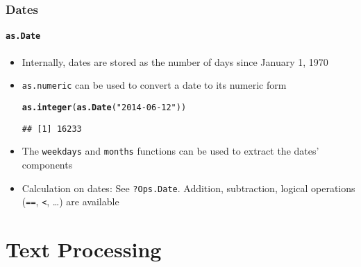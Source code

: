 \documentclass[paper=screen,mathserif]{beamer}\usepackage[]{graphicx}\usepackage[]{color}
\makeatletter
\newcommand{\hlstr}[1]{\textcolor[rgb]{0.192,0.494,0.8}{#1}}%
\newcommand{\hlstd}[1]{\textcolor[rgb]{0.345,0.345,0.345}{#1}}%
\newcommand{\hlkwd}[1]{\textcolor[rgb]{0.737,0.353,0.396}{\textbf{#1}}}%
\newenvironment{kframe}{%
 \def\at@end@of@kframe{}%
 \ifinner\ifhmode%
  \def\at@end@of@kframe{\end{minipage}}%
  \begin{minipage}{\columnwidth}%
 \fi\fi%
 \def\FrameCommand##1{\hskip\@totalleftmargin \hskip-\fboxsep
 \colorbox{shadecolor}{##1}\hskip-\fboxsep
     \hskip-\linewidth \hskip-\@totalleftmargin \hskip\columnwidth}%
 \MakeFramed {\advance\hsize-\width
   \@totalleftmargin\z@ \linewidth\hsize
   \@setminipage}}%
 {\par\unskip\endMakeFramed%
 \at@end@of@kframe}
\newenvironment{knitrout}{}{} %
\newcommand{\ft}[1]{\frametitle{#1}}
\newcommand{\fst}[1]{\framesubtitle{#1}}
\makeatother
\begin{document}
\begin{frame}[fragile]
  \ft{Dates}
  \fst{{\tt as.Date}}
  
  \begin{itemize}
  \item Internally, dates are stored as the number of days since
    January 1, 1970
  \item {\tt as.numeric} can be used to convert a date to its numeric form
\begin{knitrout}\small
{}\color{fgcolor}\begin{kframe}
\begin{alltt}
\hlkwd{as.integer}\hlstd{(}\hlkwd{as.Date}\hlstd{(}\hlstr{"2014-06-12"}\hlstd{))}
\end{alltt}
\begin{verbatim}
## [1] 16233
\end{verbatim}
\end{kframe}
\end{knitrout}
  \item The \verb=weekdays= and \verb=months= functions can be used to
    extract the dates' components
  \item Calculation on dates: See \verb=?Ops.Date=. Addition,
    subtraction, logical operations (\verb|==|, \verb=<=, \dots) are
    available

  \end{itemize}
\end{frame}


\section{Text Processing}
\end{document}
